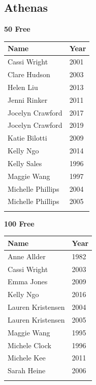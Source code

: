 
\clearpage
{}
\clearpage
\subsection{Athenas}
\vspace{1.2em}
\noindent\begin{minipage}[t]{0.48\textwidth}
\centering
\textbf{\textcolor{teamprimary}{50 Free}}\par
\vspace{0.5em}
\centering
\small
\renewcommand{\arraystretch}{1.0}
\setlength{\tabcolsep}{4pt}
\begin{tabular}{@{}p{3.0cm}p{1.0cm}@{}}
\toprule
\textbf{Name} & \textbf{Year} \\
\midrule
Cassi Wright & 2001 \\
Clare Hudson & 2003 \\
Helen Liu & 2013 \\
Jenni Rinker & 2011 \\
Jocelyn Crawford & 2017 \\
Jocelyn Crawford & 2019 \\
Katie Bilotti & 2009 \\
Kelly Ngo & 2014 \\
Kelly Sales & 1996 \\
Maggie Wang & 1997 \\
Michelle Phillips & 2004 \\
Michelle Phillips & 2005 \\
\bottomrule
\vspace{0.5em}
\end{tabular}
\end{minipage}
\hfill
\begin{minipage}[t]{0.48\textwidth}
\centering
\textbf{\textcolor{teamprimary}{100 Free}}\par
\vspace{0.5em}
\centering
\small
\renewcommand{\arraystretch}{1.0}
\setlength{\tabcolsep}{4pt}
\begin{tabular}{@{}p{3.0cm}p{1.0cm}@{}}
\toprule
\textbf{Name} & \textbf{Year} \\
\midrule
Anne Allder & 1982 \\
Cassi Wright & 2003 \\
Emma Jones & 2009 \\
Kelly Ngo & 2016 \\
Lauren Kristensen & 2004 \\
Lauren Kristensen & 2005 \\
Maggie Wang & 1995 \\
Michele Clock & 1996 \\
Michele Kee & 2011 \\
Sarah Heine & 2006 \\
\bottomrule
\vspace{0.5em}
\end{tabular}
\end{minipage}
